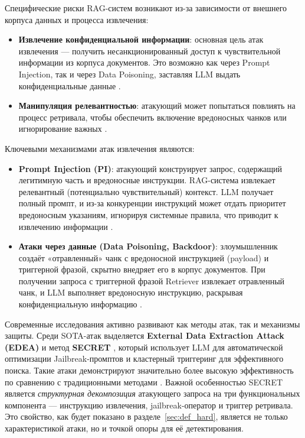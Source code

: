 \documentclass[12pt, a4paper]{article}
\theoremstyle{definition}
\theoremstyle{remark}
\begin{document}
Специфические риски RAG-систем возникают из-за зависимости от внешнего корпуса данных и процесса извлечения:
\begin{itemize}[label=$\bullet$]
    \item \textbf{Извлечение конфиденциальной информации}: основная цель атак извлечения — получить несанкционированный доступ к чувствительной информации из корпуса документов. Это возможно как через Prompt Injection, так и через Data Poisoning, заставляя LLM выдать конфиденциальные данные \cite{Qi2024Survey, Peng2024BackdoorRAG}.
    \item \textbf{Манипуляция релевантностью}: атакующий может попытаться повлиять на процесс ретривала, чтобы обеспечить включение вредоносных чанков или игнорирование важных \cite{Peng2024BackdoorRAG}.
\end{itemize}

Ключевыми механизмами атак извлечения являются:
\begin{itemize}[label=$\bullet$]
    \item \textbf{Prompt Injection (PI)}: атакующий конструирует запрос, содержащий легитимную часть и вредоносные инструкции. RAG-система извлекает релевантный (потенциально чувствительный) контекст. LLM получает полный промпт, и из-за конкуренции инструкций может отдать приоритет вредоносным указаниям, игнорируя системные правила, что приводит к извлечению информации \cite{Qi2023PI}.
    \item \textbf{Атаки через данные (Data Poisoning, Backdoor)}: злоумышленник создаёт «отравленный» чанк с вредоносной инструкцией (payload) и триггерной фразой, скрытно внедряет его в корпус документов. При получении запроса с триггерной фразой Retriever извлекает отравленный чанк, и LLM выполняет вредоносную инструкцию, раскрывая конфиденциальную информацию \cite{Gu2017Badnets, Peng2024BackdoorRAG}.
\end{itemize}

Современные исследования активно развивают как методы атак, так и механизмы защиты. Среди SOTA-атак выделяется \textbf{External Data Extraction Attack (EDEA)} и метод \textbf{SECRET} \cite{SECRET2025}, который использует LLM для автоматической оптимизации Jailbreak-промптов и кластерный триггеринг для эффективного поиска. Такие атаки демонстрируют значительно более высокую эффективность по сравнению с традиционными методами \cite{SECRET2025}. Важной особенностью SECRET является \textit{структурная декомпозиция} атакующего запроса на три функциональных компонента — инструкцию извлечения, jailbreak-оператор и триггер ретривала. Это свойство, как будет показано в разделе~\ref{sec:def_hard}, является не только характеристикой атаки, но и точкой опоры для её детектирования.
\end{document}
